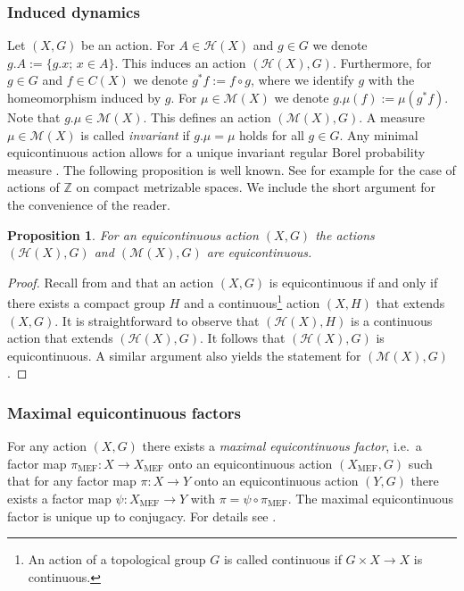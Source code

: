 \documentclass[12pt, reqno]{amsart}
\newtheorem{proposition}[theorem]{Proposition}
\theoremstyle{definition}
\theoremstyle{remark}
\numberwithin{equation}{section}
\theoremstyle{theorem}
\theoremstyle{remark}
\def\hyper{{\mathcal{H}}}
\begin{document}
\subsubsection{Induced dynamics}
\label{subsubsec:prelims_actions_InducedDynamics}
Let $(X,G)$ be an action. 
For $A\in \hyper(X)$ and $g\in G$ we denote $g.A:=\{g.x;\, x\in A\}$. 
This induces an action $(\hyper(X),G)$. 
Furthermore, for $g\in G$ and $f\in C(X)$ we denote $g^*f:=f\circ g$, where we identify $g$ with the homeomorphism induced by $g$. 
For $\mu\in \mathcal{M}(X)$ we denote $g.\mu(f):=\mu(g^*f)$. 
Note that $g.\mu\in \mathcal{M}(X)$. 
This defines an action $(\mathcal{M}(X),G)$. 
A measure $\mu\in \mathcal{M}(X)$ is called \emph{invariant} if $g.\mu=\mu$ holds for all $g\in G$. 
Any minimal equicontinuous action allows for a unique invariant regular Borel probability measure \cite[Chapter~7]{auslander1988minimal}. 
The following proposition is well known. See for example \cite[Proposition 7]{bauer1975topological} for the case of actions of $\mathbb{Z}$ on compact metrizable spaces. We include the short argument for the convenience of the reader. 

\begin{proposition}
    For an equicontinuous action $(X,G)$ the actions $(\hyper(X),G)$ and $(\mathcal{M}(X),G)$ are equicontinuous. 
\end{proposition}
\begin{proof}
    Recall from \cite[Proposition~2.1]{auslander1988minimal} and \cite[Theorem~3.2]{auslander1988minimal} that an action $(X,G)$ is equicontinuous if and only if there exists a compact group $H$ and a continuous\footnote{An action of a topological group $G$ is called continuous if $G\times X\to X$ is continuous.} action $(X,H)$ that extends $(X,G)$. 
    It is straightforward to observe that $(\hyper(X),H)$ is a continuous action that extends $(\hyper(X),G)$. It follows that $(\hyper(X),G)$ is equicontinuous. A similar argument also yields the statement for $(\mathcal{M}(X),G)$. 
\end{proof}

\subsubsection{Maximal equicontinuous factors}
\label{subsubsec:prelims_actions_MaximalEquicontinuousFactor}
For any action $(X,G)$ there exists a \emph{maximal equicontinuous factor}, i.e.\ a factor map $\pi_{\operatorname{MEF}}\colon X\to X_{\operatorname{MEF}}$ onto an equicontinuous action $(X_{\operatorname{MEF}},G)$ such that for any factor map $\pi\colon X\to Y$ onto an equicontinuous action $(Y,G)$ there exists a factor map $\psi\colon X_{\operatorname{MEF}}\to Y$ with $\pi=\psi \circ \pi_{\operatorname{MEF}}$. The maximal equicontinuous factor is unique up to conjugacy. For details see \cite{auslander1988minimal}. 
\end{document}

